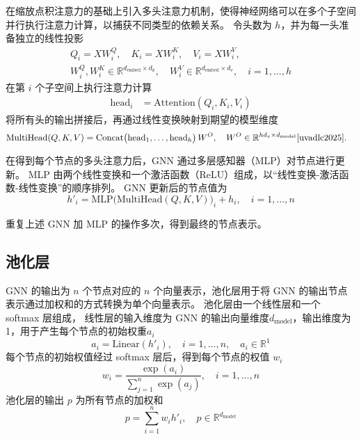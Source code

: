 在缩放点积注意力的基础上引入多头注意力机制，使得神经网络可以在多个子空间并行执行注意力计算，以捕获不同类型的依赖关系。
令头数为 $h$，并为每一头准备独立的线性投影
\begin{align}
    Q_i = X W_i^Q,\quad
    K_i = X W_i^K,\quad
    V_i = X W_i^V,\quad \\
    W_i^Q, W_i^K \in\mathbb{R}^{d_{\text{embed}}\times d_k}, \quad
    W_i^V \in \mathbb{R}^{d_{\text{embed}}\times d_v},
    \quad i=1,\dots,h
\end{align}
在第 $i$ 个子空间上执行注意力计算
\begin{align}
    \mathrm{head}_i & = \mathrm{Attention}(Q_i, K_i, V_i)
\end{align}
将所有头的输出拼接后，再通过线性变换映射到期望的模型维度
\begin{align}
    \mathrm{MultiHead}(Q,K,V)
     & = \mathrm{Concat}\bigl(\mathrm{head}_1,\dots,\mathrm{head}_h\bigr)\,W^O,
    \quad W^O\in\mathbb{R}^{hd_v\times d_{\text{model}}}
    \cite{uvadlc2025}.
\end{align}

在得到每个节点的多头注意力后，GNN 通过多层感知器（MLP）对节点进行更新。
MLP 由两个线性变换和一个激活函数（ReLU）组成，以“线性变换-激活函数-线性变换”的顺序排列。
GNN 更新后的节点值为
\begin{equation}
    h'_i = \mathrm{MLP}\bigl(\mathrm{MultiHead}(Q,K,V)\bigr)_i + h_i,
    \quad i=1,\dots,n
\end{equation}

重复上述 GNN 加 MLP 的操作多次，得到最终的节点表示。


\subsection{池化层}
GNN 的输出为 $n$ 个节点对应的 $n$ 个向量表示，池化层用于将 GNN 的输出节点表示通过加权和的方式转换为单个向量表示。
池化层由一个线性层和一个 softmax 层组成，
线性层的输入维度为 GNN 的输出向量维度$d_{\text{model}}$，输出维度为 1，用于产生每个节点的初始权重$a_i$
\begin{equation}
    a_i = \mathrm{Linear}(h'_i), \quad i=1,\dots,n,
    \quad a_i\in\mathbb{R}^1
\end{equation}
每个节点的初始权值经过 softmax 层后，得到每个节点的权值 $w_i$
\begin{equation}
    w_i = \frac{\exp(a_i)}{\sum_{j=1}^n \exp(a_j)}, \quad i=1,\dots,n
\end{equation}
池化层的输出 $p$ 为所有节点的加权和
\begin{equation}
    p = \sum_{i=1}^n w_i h'_i,
    \quad p\in\mathbb{R}^{d_{\text{model}}}
\end{equation}


